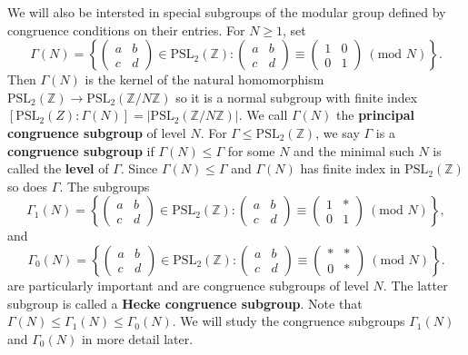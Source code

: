 \documentclass[12pt]{book}
\theoremstyle{definition}\newframedtheorem{method}{Method}
\newcommand{\tmod}[1]{\ \left(\text{mod }#1\right)}
\newcommand{\PSL}{\mathrm{PSL}}
\newcommand{\Z}{\mathbb{Z}}
\newcommand{\G}{\Gamma}
\newcommand{\<}{\langle}
\renewcommand{\>}{\rangle}
\begin{document}
       We will also be intersted in special subgroups of the modular group defined by congruence conditions on their entries. For $N \ge 1$, set
      \[
        \G(N) = \left\{\begin{pmatrix} a & b \\ c & d \end{pmatrix} \in \PSL_{2}(\Z):\begin{pmatrix} a & b \\ c & d \end{pmatrix} \equiv \begin{pmatrix} 1 & 0 \\ 0 & 1 \end{pmatrix} \tmod{N}\right\}.
      \]
      Then $\G(N)$ is the kernel of the natural homomorphism $\PSL_{2}(\Z) \to \PSL_{2}(\Z/N\Z)$ so it is a normal subgroup with finite index $[\PSL_{2}(Z):\G(N)] = |\PSL_{2}(\Z/N\Z)|$. We call $\G(N)$ the \textbf{principal congruence subgroup} of level $N$. For $\G \le \PSL_{2}(\Z)$, we say $\G$ is a \textbf{congruence subgroup} if $\G(N) \le \G$ for some $N$ and the minimal such $N$ is called the \textbf{level} of $\G$. Since $\G(N) \le \G$ and $\G(N)$ has finite index in $\PSL_{2}(\Z)$ so does $\G$. The subgroups
      \[
        \G_{1}(N) = \left\{\begin{pmatrix} a & b \\ c & d \end{pmatrix} \in \PSL_{2}(\Z):\begin{pmatrix} a & b \\ c & d \end{pmatrix} \equiv \begin{pmatrix} 1 & \ast \\ 0 & 1 \end{pmatrix} \tmod{N}\right\},
      \]
      and
      \[
        \G_{0}(N) = \left\{\begin{pmatrix} a & b \\ c & d \end{pmatrix} \in \PSL_{2}(\Z):\begin{pmatrix} a & b \\ c & d \end{pmatrix} \equiv \begin{pmatrix} \ast & \ast \\ 0 & \ast \end{pmatrix} \tmod{N}\right\}.
      \]
      are particularly important and are congruence subgroups of level $N$. The latter subgroup is called a \textbf{Hecke congruence subgroup}. Note that $\G(N) \le \G_{1}(N) \le \G_{0}(N)$. We will study the congruence subgroups $\G_{1}(N)$ and $\G_{0}(N)$ in more detail later.
\end{document}
